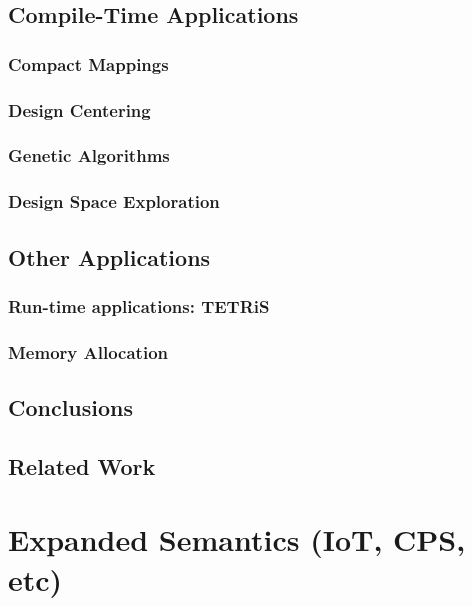 \documentclass{report}
\begin{document}
\chapter{Compile-Time Applications}

\section{Compact Mappings}
\section{Design Centering}
\section{Genetic Algorithms}
\section{Design Space Exploration}

\chapter{Other Applications}

\section{Run-time applications: TETRiS}
\section{Memory Allocation}

\chapter{Conclusions}


\chapter{Related Work}



\part{Expanded Semantics (IoT, CPS, etc)}

\end{document}
